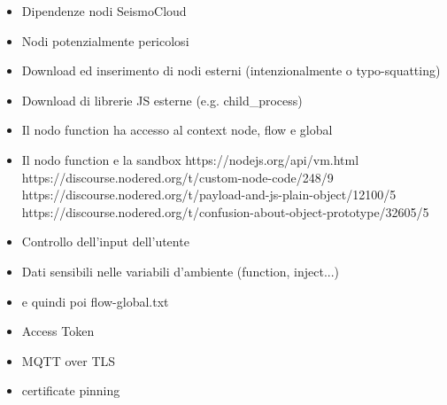 \documentclass[a4paper,10pt]{memoir}
\begin{document}
\begin{itemize}
    \item Dipendenze nodi SeismoCloud
    \item Nodi potenzialmente pericolosi
    \item Download ed inserimento di nodi esterni (intenzionalmente o typo-squatting)
    \item Download di librerie JS esterne (e.g. child\_process)
    \item Il nodo function ha accesso al context node, flow e global
    \item Il nodo function e la sandbox https://nodejs.org/api/vm.html
    https://discourse.nodered.org/t/custom-node-code/248/9
    https://discourse.nodered.org/t/payload-and-js-plain-object/12100/5
    https://discourse.nodered.org/t/confusion-about-object-prototype/32605/5
    \item Controllo dell'input dell'utente
    \item Dati sensibili nelle variabili d'ambiente (function, inject...)
    \item e quindi poi flow-global.txt
    \item Access Token
    \item MQTT over TLS
    \item certificate pinning
\end{itemize}
\end{document}
